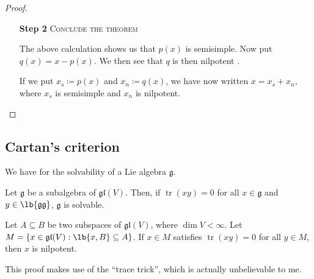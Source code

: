 \documentclass{article}
\DeclarePairedDelimiter\lb\lbrack\rbrack
\DeclareMathOperator{\tr}{tr}
\newcommand*\frkg{{\ensuremath{\mathfrak{g}}}}
\newcommand*\gl{\ensuremath{\mathfrak{gl}}}
\begin{document}
\begin{proof}
\begin{itemize}
        \item[\textbf{Step 2}] 
            \textsc{\color{Crimson} Conclude the theorem}

            The above calculation shows us that $p(x)$ is semisimple.
            Now put $q(x) = x - p(x)$.
            We then see that $q$ is then nilpotent .

            If we put $x_s \coloneq p(x)$ and $x_n \coloneq q(x)$, we have now written $x = x_s + x_n$, where $x_s$ is semisimple and $x_n$ is nilpotent.


    \end{itemize}

\end{proof}

\subsection{Cartan's criterion}

We have  for the solvability of a Lie algebra $\frkg$.

\begin{theorem}
    \label{thm:Cartan'sCriterion}
    Let $\frkg$ be a subalgebra of $\gl(V)$.
    Then, if $\tr(xy) = 0$ for all $x \in \frkg$ and $y \in \lb{\frkg\frkg}$, $\frkg$ is solvable.
\end{theorem}

\begin{lemma}
    \label{lem:TraceNilpotence}
    Let $A \subseteq B$ be two subspaces of $\gl(V)$, where $\dim V < \infty$.
    Let $M = \{x \in \gl(V) : \lb{x,B} \subseteq A\}$.
    If $x \in M$ satisfies $\tr(xy) = 0$ for all $y \in M$, then $x$ is nilpotent.
\end{lemma}

This proof makes use of the ``trace trick'', which is actually unbelievable to me.
\end{document}
